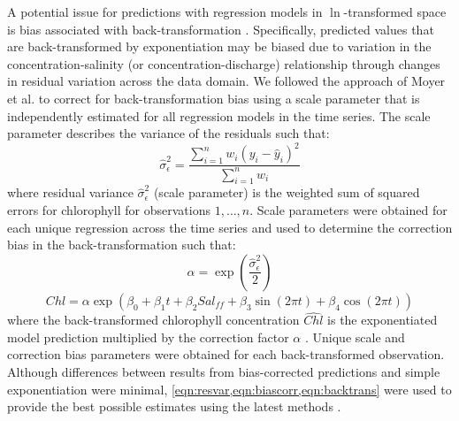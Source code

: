 \documentclass{svjour3}\usepackage[]{graphicx}\usepackage[]{color}
\begin{document}
A potential issue for predictions with regression models in $\ln$-transformed space is bias associated with back-transformation \cite{Duan83}.  Specifically, predicted values that are back-transformed by exponentiation may be biased due to variation in the concentration-salinity (or concentration-discharge) relationship through changes in residual variation across the data domain.  We followed the approach of Moyer et al. \cite{Moyer12} to correct for back-transformation bias using a scale parameter that is independently estimated for all regression models in the time series.  The scale parameter describes the variance of the residuals such that: 
\begin{equation}\label{eqn:resvar}
\hat{\sigma}_\epsilon^2 =\frac{\sum\limits_{{i = 1}}^n w_i \left(y_i - \hat{y}_i \right)^2}{\sum\limits_{{i = 1}}^n w_i }
\end{equation}
\noindent where residual variance $\hat{\sigma}_\epsilon^2$ (scale parameter) is the weighted sum of squared errors for chlorophyll for observations $1,\ldots,n$.  Scale parameters were obtained for each unique regression across the time series and used to determine the correction bias in the back-transformation such that:
\begin{equation}\label{eqn:biascorr}
\alpha = \exp\left(\frac{\hat{\sigma}_\epsilon^2}{2}\right)
\end{equation}
\begin{equation}\label{eqn:backtrans}
\hat{Chl} = \alpha \exp\left(\beta_0 + \beta_1 t + \beta_2 Sal_{ff} + \beta_3 \sin\left(2\pi t\right) + \beta_4 \cos\left(2\pi t\right)\right)
\end{equation}
\noindent where the back-transformed chlorophyll concentration $\hat{Chl}$ is the exponentiated model prediction multiplied by the correction factor $\alpha$ \cite{Moyer12}.  Unique scale and correction bias parameters were obtained for each back-transformed observation.  Although differences between results from bias-corrected predictions and simple exponentiation were minimal, \cref{eqn:resvar,eqn:biascorr,eqn:backtrans} were used to provide the best possible estimates using the latest methods \cite{Hirsch10,Moyer12}. 
\end{document}
